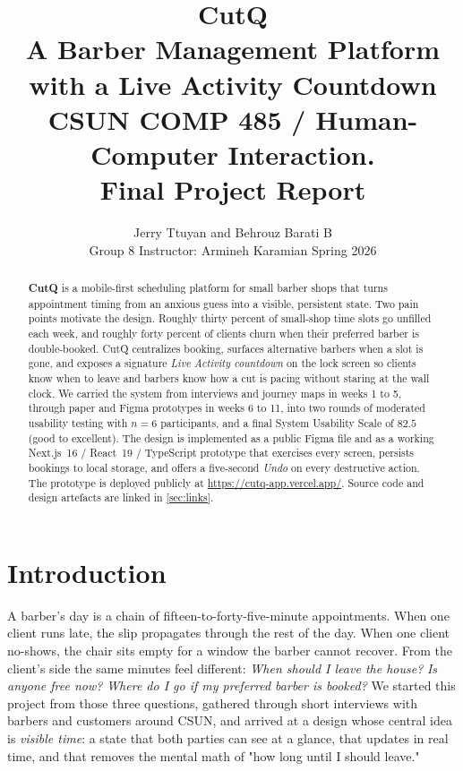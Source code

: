 \documentclass[12pt,a4paper]{article}
\title{
  \vspace{-1.5em}
  \Huge\textbf{CutQ}\\[0.3em]
  \LARGE A Barber Management Platform with a Live Activity Countdown\\[0.6em]
  \large CSUN COMP 485 / Human-Computer Interaction.\\
  Final Project Report
}
\author{
  Jerry Ttuyan \quad and \quad Behrouz Barati B\\[0.3em]
  \small Group 8 \quad\textbullet\quad Instructor: Armineh Karamian \quad\textbullet\quad Spring 2026
}
\date{}
\begin{document}
\maketitle
\vspace{-1em}

\begin{abstract}
\noindent
\textbf{CutQ} is a mobile-first scheduling platform for small barber
shops that turns appointment timing from an anxious guess into a
visible, persistent state. Two pain points motivate the design.
Roughly thirty percent of small-shop time slots go unfilled each
week, and roughly forty percent of clients churn when their preferred
barber is double-booked. CutQ centralizes booking, surfaces
alternative barbers when a slot is gone, and exposes a signature
\emph{Live Activity countdown} on the lock screen so clients know
when to leave and barbers know how a cut is pacing without staring at
the wall clock. We carried the system from interviews and journey
maps in weeks 1 to 5, through paper and Figma prototypes in weeks 6
to 11, into two rounds of moderated usability testing with $n=6$
participants, and a final System Usability Scale of $82.5$ (good to
excellent). The design is implemented as a public Figma file and as a
working Next.js~16 / React~19 / TypeScript prototype that exercises
every screen, persists bookings to local storage, and offers a
five-second \emph{Undo} on every destructive action. The prototype
is deployed publicly at \url{https://cutq-app.vercel.app/}. Source
code and design artefacts are linked in \cref{sec:links}.
\end{abstract}

\section{Introduction}
\label{sec:intro}

A barber's day is a chain of fifteen-to-forty-five-minute
appointments. When one client runs late, the slip propagates through
the rest of the day. When one client no-shows, the chair sits empty
for a window the barber cannot recover. From the client's side the
same minutes feel different: \emph{When should I leave the house?}
\emph{Is anyone free now?} \emph{Where do I go if my preferred barber
is booked?} We started this project from those three questions,
gathered through short interviews with barbers and customers around
CSUN, and arrived at a design whose central idea is \emph{visible
time}: a state that both parties can see at a glance, that updates in
real time, and that removes the mental math of "how long until I
should leave."
\end{document}
